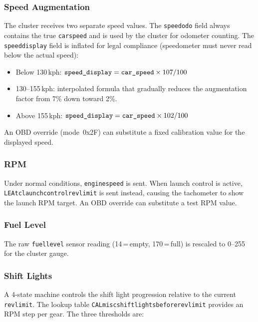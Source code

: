 \documentclass[a4paper,11pt]{article}
\renewcommand{\_}{\oldunderscore\allowbreak}
\begin{document}
\subsubsection*{Speed Augmentation}

The cluster receives two separate speed values. The \texttt{speed\_odo} field
always contains the true \texttt{car\_speed} and is used by the cluster for
odometer counting. The \texttt{speed\_display} field is inflated for legal
compliance (speedometer must never read below the actual speed):

\begin{itemize}
\item Below 130\,kph: $\texttt{speed\_display} = \texttt{car\_speed} \times 107 / 100$
\item 130--155\,kph: interpolated formula that gradually reduces the
      augmentation factor from 7\% down toward 2\%.
\item Above 155\,kph: $\texttt{speed\_display} = \texttt{car\_speed} \times 102 / 100$
\end{itemize}

An OBD override (mode~0x2F) can substitute a fixed calibration value for
the displayed speed.

\subsubsection*{RPM}

Under normal conditions, \texttt{engine\_speed\_2} is sent. When launch control
is active, \texttt{LEA\_tc\_launchcontrol\_revlimit} is sent instead, causing the
tachometer to show the launch RPM target. An OBD override can substitute a
test RPM value.

\subsubsection*{Fuel Level}

The raw \texttt{fuel\_level} sensor reading (14\,=\,empty, 170\,=\,full) is
rescaled to 0--255 for the cluster gauge.

\subsubsection*{Shift Lights}

A 4-state machine controls the shift light progression relative to the current
\texttt{revlimit}. The lookup table
\texttt{CAL\_misc\_shift\_lights\_before\_revlimit} provides an RPM step
per gear. The three thresholds are:
\end{document}
